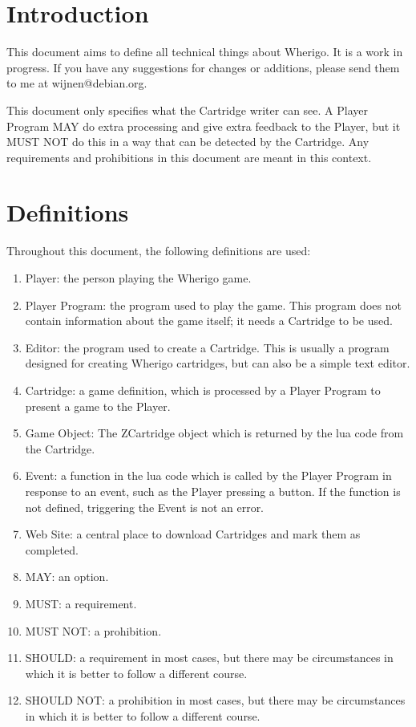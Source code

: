 \documentclass{article}
\begin{document}
\section{Introduction}
This document aims to define all technical things about Wherigo. It is a work
in progress. If you have any suggestions for changes or additions, please send
them to me at wijnen@debian.org.

This document only specifies what the Cartridge writer can see. A Player
Program MAY do extra processing and give extra feedback to the Player, but it
MUST NOT do this in a way that can be detected by the Cartridge. Any
requirements and prohibitions in this document are meant in this context.


\section{Definitions}
Throughout this document, the following definitions are used:

\begin{enumerate}
	\item Player: the person playing the Wherigo game.
	\item Player Program: the program used to play the game. This program does not contain information about the game itself; it needs a Cartridge to be used.
	\item Editor: the program used to create a Cartridge. This is usually a program designed for creating Wherigo cartridges, but can also be a simple text editor.
	\item Cartridge: a game definition, which is processed by a Player Program to present a game to the Player.
	\item Game Object: The ZCartridge object which is returned by the lua code from the Cartridge.
	\item Event: a function in the lua code which is called by the Player Program in response to an event, such as the Player pressing a button. If the function is not defined, triggering the Event is not an error.
	\item Web Site: a central place to download Cartridges and mark them as completed.
	\item MAY: an option.
	\item MUST: a requirement.
	\item MUST NOT: a prohibition.
	\item SHOULD: a requirement in most cases, but there may be circumstances in which it is better to follow a different course.
	\item SHOULD NOT: a prohibition in most cases, but there may be circumstances in which it is better to follow a different course.
\end{enumerate}
\end{document}

